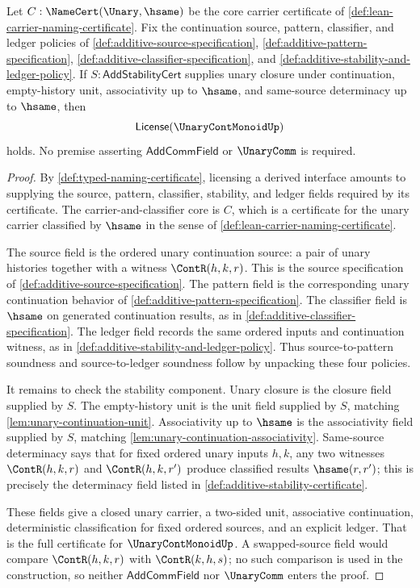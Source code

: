\begin{theorem}
\label{thm:unary-continuation-monoid-activation-from-stability}
Let $C:\NameCert(\Unary,\hsame)$ be the core carrier certificate of \autoref{def:lean-carrier-naming-certificate}. Fix the continuation source, pattern, classifier, and ledger policies of \autoref{def:additive-source-specification}, \autoref{def:additive-pattern-specification}, \autoref{def:additive-classifier-specification}, and \autoref{def:additive-stability-and-ledger-policy}. If $S:\mathsf{AddStabilityCert}$ supplies unary closure under continuation, empty-history unit, associativity up to $\hsame$, and same-source determinacy up to $\hsame$, then
$$
  \mathsf{License}(\UnaryContMonoidUp)
$$
holds. No premise asserting $\mathsf{AddCommField}$ or $\UnaryComm$ is required.
\end{theorem}
\begin{proof}
By \autoref{def:typed-naming-certificate}, licensing a derived interface amounts to supplying the source, pattern, classifier, stability, and ledger fields required by its certificate. The carrier-and-classifier core is $C$, which is a certificate for the unary carrier classified by $\hsame$ in the sense of \autoref{def:lean-carrier-naming-certificate}.

The source field is the ordered unary continuation source: a pair of unary histories together with a witness $\ContR(h,k,r)$. This is the source specification of \autoref{def:additive-source-specification}. The pattern field is the corresponding unary continuation behavior of \autoref{def:additive-pattern-specification}. The classifier field is $\hsame$ on generated continuation results, as in \autoref{def:additive-classifier-specification}. The ledger field records the same ordered inputs and continuation witness, as in \autoref{def:additive-stability-and-ledger-policy}. Thus source-to-pattern soundness and source-to-ledger soundness follow by unpacking these four policies.

It remains to check the stability component. Unary closure is the closure field supplied by $S$. The empty-history unit is the unit field supplied by $S$, matching \autoref{lem:unary-continuation-unit}. Associativity up to $\hsame$ is the associativity field supplied by $S$, matching \autoref{lem:unary-continuation-associativity}. Same-source determinacy says that for fixed ordered unary inputs $h,k$, any two witnesses $\ContR(h,k,r)$ and $\ContR(h,k,r')$ produce classified results $\hsame(r,r')$; this is precisely the determinacy field listed in \autoref{def:additive-stability-certificate}.

These fields give a closed unary carrier, a two-sided unit, associative continuation, deterministic classification for fixed ordered sources, and an explicit ledger. That is the full certificate for $\UnaryContMonoidUp$. A swapped-source field would compare $\ContR(h,k,r)$ with $\ContR(k,h,s)$; no such comparison is used in the construction, so neither $\mathsf{AddCommField}$ nor $\UnaryComm$ enters the proof.
\end{proof}

